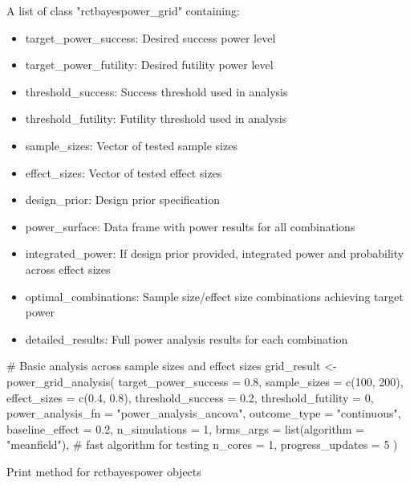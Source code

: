 \documentclass[letterpaper]{book}
\begin{document}
\begin{Value}
A list of class "rctbayespower\_grid" containing:
\begin{itemize}

\item{} target\_power\_success: Desired success power level
\item{} target\_power\_futility: Desired futility power level
\item{} threshold\_success: Success threshold used in analysis
\item{} threshold\_futility: Futility threshold used in analysis
\item{} sample\_sizes: Vector of tested sample sizes
\item{} effect\_sizes: Vector of tested effect sizes
\item{} design\_prior: Design prior specification
\item{} power\_surface: Data frame with power results for all combinations
\item{} integrated\_power: If design prior provided, integrated power and probability across effect sizes
\item{} optimal\_combinations: Sample size/effect size combinations achieving target power
\item{} detailed\_results: Full power analysis results for each combination

\end{itemize}

\end{Value}
%
\begin{Examples}
\begin{ExampleCode}

# Basic analysis across sample sizes and effect sizes
grid_result <- power_grid_analysis(
  target_power_success = 0.8,
  sample_sizes = c(100, 200),
  effect_sizes = c(0.4, 0.8),
  threshold_success = 0.2,
  threshold_futility = 0,
  power_analysis_fn = "power_analysis_ancova",
  outcome_type = "continuous",
  baseline_effect = 0.2,
  n_simulations = 1,
  brms_args = list(algorithm = "meanfield"), # fast algorithm for testing
  n_cores = 1,
  progress_updates = 5
)

\end{ExampleCode}
\end{Examples}
%
\begin{Description}
Print method for rctbayespower objects
\end{Description}
\end{document}
